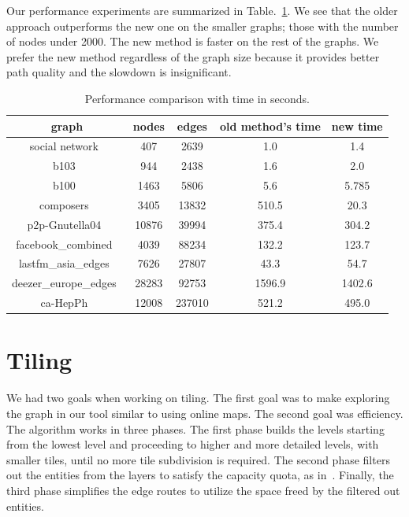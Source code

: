\documentclass{llncs}
\begin{document}
{Our performance experiments are summarized in Table.~\ref{tab:perf}. We see that the older approach outperforms the new one on the smaller graphs;
those with the number of nodes under 2000. The new method is faster on the rest of the graphs.
We prefer the new method regardless of the graph size because it provides better path quality and the slowdown is insignificant.

\begin{table}
  \begin{center}
    \begin{tabular}{||c |c| c| c| c||}
      \hline
      graph                                   & nodes & edges  & old method's time & new time \\ [0.5ex]
      \hline\hline
      social network~\cite{beveridge2018game} & 407   & 2639   & 1.0               & 1.4      \\
      \hline
      b103~\cite{b103}                        & 944   & 2438   & 1.6               & 2.0      \\
      \hline
      b100~\cite{b100}                        & 1463  & 5806   & 5.6               & 5.785    \\
      \hline
      composers~\cite{composers}              & 3405  & 13832  & 510.5             & 20.3     \\
      \hline
      p2p-Gnutella04~\cite{gnutella}          & 10876 & 39994  & 375.4             & 304.2    \\
      \hline
      facebook\_combined~\cite{fb}            & 4039  & 88234  & 132.2             & 123.7    \\
      \hline
      lastfm\_asia\_edges~\cite{feather}      & 7626  & 27807  & 43.3              & 54.7     \\
      \hline
      deezer\_europe\_edges~\cite{feather}    & 28283 & 92753  & 1596.9            & 1402.6   \\
      \hline
      ca-HepPh~\cite{leskovec2007graph}       & 12008 & 237010 & 521.2             & 495.0    \\
      \hline
    \end{tabular}
    \caption{Performance comparison with time in seconds.}
    \label{tab:perf}
  \end{center}

\end{table}
\section{Tiling}
We had two goals when working on tiling. The first goal was to make exploring the graph in our tool similar to using online maps. The second goal was efficiency.
The algorithm works in three phases. The first phase builds the levels starting from the lowest level and proceeding to higher and more detailed levels, with smaller tiles, until no more tile subdivision is required. The second phase filters out the entities from the layers to satisfy the capacity quota, as in~\cite{nachmanson2015graphmaps}. Finally, the third phase simplifies the edge routes to utilize the space freed by the filtered out entities.


}
\end{document}
